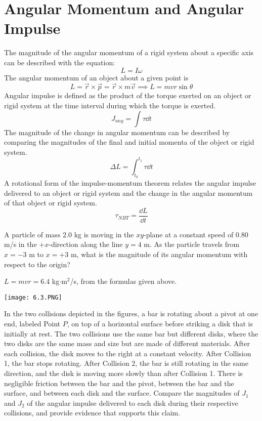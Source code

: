 \documentclass[../mech.tex]{subfiles}
\begin{document}
\section{Angular Momentum and Angular Impulse}
The magnitude of the angular momentum of a rigid system about a specific axis can be described with the equation:
\[ L = I\omega \]
The angular momentum of an object about a given point is 
\[ L = \vec{r}\times \vec{p}=\vec{r}\times m\vec{v}\implies L = mvr\sin \theta \]
Angular impulse is defined as the product of the torque exerted on an object or rigid system at the time interval during which the torque is exerted.
\[ J_{ang}=\int \tau \dd t\]
The magnitude of the change in angular momentum can be described by comparing the magnitudes of the final and initial momenta of the object or rigid system.
\[ \Delta L = \int_{t_0}^{t_1}\tau \dd t\]
A rotational form of the impulse-momentum theorem relates the angular impulse delivered to an object or rigid system and the change in the angular momentum of that object or rigid system.
\[ \tau_{NBT}=\frac{\dd L}{\dd t} \]
\pagebreak
\begin{example}
    A particle of mass $2.0$ kg is moving in the $xy$-plane at a constant speed of $0.80$ m/s in the $+x$-direction along the line $y=4$ m. As the particle travels from $x=-3$ m to $x=+3$ m, what is the magnitude of its angular momentum with respect to the origin?

    $L=mvr = 6.4$ kg$\cdot$m$^2$/s, from the formulas given above.
\end{example}

\ex \begin{center}
    \texttt{[image: 6.3.PNG]}
\end{center}
In the two collisions depicted in the figures, a bar is rotating about a pivot at one end, labeled Point $P$, on top of a horizontal surface before striking a disk that is initially at rest.
The two collisions use the same bar but different disks, where the two disks are the same mass and size but are made of different materials. After each collision, the disk moves to the right at a constant velocity.
After Collision 1, the bar stops rotating. After Collision 2, the bar is still rotating in the same direction, and the disk is moving more slowly than after Collision 1. There is negligible friction between the bar 
and the pivot, between the bar and the surface, and between each disk and the surface. Compare the magnitudes of $J_1$ and $J_2$ of the angular impulse delivered to each disk during their respective collisions, and provide evidence that supports this claim.
\end{document}
